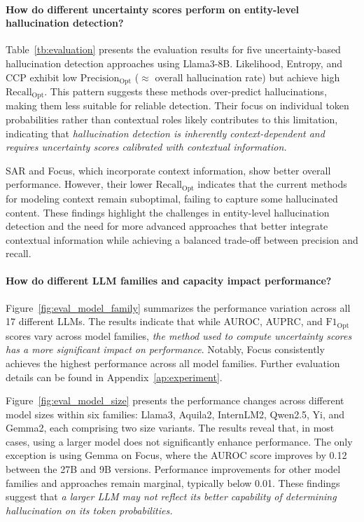 \paragraph{How do different uncertainty scores perform on entity-level hallucination detection?}

Table~\ref{tb:evaluation} presents the evaluation results for five uncertainty-based hallucination detection approaches using Llama3-8B. 
Likelihood, Entropy, and CCP exhibit low $\mathrm{Precision}_\mathrm{Opt}$ ($\approx$ overall hallucination rate) but achieve high $\mathrm{Recall}_\mathrm{Opt}$. This pattern suggests these methods over-predict hallucinations, making them less suitable for reliable detection. Their focus on individual token probabilities rather than contextual roles likely contributes to this limitation, indicating that \emph{hallucination detection is inherently context-dependent and requires uncertainty scores calibrated with contextual information.} 

SAR and Focus, which incorporate context information, show better overall performance. However, their lower $\mathrm{Recall}_\mathrm{Opt}$ indicates that the current methods for modeling context remain suboptimal, failing to capture some hallucinated content. These findings highlight the challenges in entity-level hallucination detection and the need for more advanced approaches that better integrate contextual information while achieving a balanced trade-off between precision and recall. 



\paragraph{How do different LLM families and capacity impact performance?}

Figure~\ref{fig:eval_model_family} summarizes the performance variation across all 17 different LLMs. The results indicate that while AUROC, AUPRC, and $\mathrm{F1}_\mathrm{Opt}$ scores vary across model families, \emph{the method used to compute uncertainty scores has a more significant impact on performance}. Notably, Focus consistently achieves the highest performance across all model families. Further evaluation details can be found in Appendix~\ref{ap:experiment}.



Figure~\ref{fig:eval_model_size} presents the performance changes across different model sizes within six families: Llama3, Aquila2, InternLM2, Qwen2.5, Yi, and Gemma2, each comprising two size variants. The results reveal that, in most cases, using a larger model does not significantly enhance performance. The only exception is using Gemma on Focus, where the AUROC score improves by 0.12 between the 27B and 9B versions. Performance improvements for other model families and approaches remain marginal, typically below 0.01. These findings suggest that \emph{a larger LLM may not reflect its better capability of determining hallucination on its token probabilities.}




